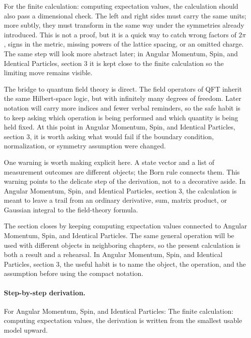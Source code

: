 For the finite calculation: computing expectation values, the calculation should also pass a dimensional check.  The left and right sides must carry the same units; more subtly, they must transform in the same way under the symmetries already introduced.  This is not a proof, but it is a quick way to catch wrong factors of \(2\pi\), signs in the metric, missing powers of the lattice spacing, or an omitted charge.  The same step will look more abstract later; in Angular Momentum, Spin, and Identical Particles, section 3 it is kept close to the finite calculation so the limiting move remains visible.

The bridge to quantum field theory is direct.  The field operators of QFT inherit the same Hilbert-space logic, but with infinitely many degrees of freedom.  Later notation will carry more indices and fewer verbal reminders, so the safe habit is to keep asking which operation is being performed and which quantity is being held fixed.  At this point in Angular Momentum, Spin, and Identical Particles, section 3, it is worth asking what would fail if the boundary condition, normalization, or symmetry assumption were changed.

One warning is worth making explicit here.  A state vector and a list of measurement outcomes are different objects; the Born rule connects them.  This warning points to the delicate step of the derivation, not to a decorative aside.  In Angular Momentum, Spin, and Identical Particles, section 3, the calculation is meant to leave a trail from an ordinary derivative, sum, matrix product, or Gaussian integral to the field-theory formula.

The section closes by keeping computing expectation values connected to Angular Momentum, Spin, and Identical Particles.  The same general operation will be used with different objects in neighboring chapters, so the present calculation is both a result and a rehearsal.  In Angular Momentum, Spin, and Identical Particles, section 3, the useful habit is to name the object, the operation, and the assumption before using the compact notation.



\paragraph{Step-by-step derivation.}

For Angular Momentum, Spin, and Identical Particles: The finite calculation: computing expectation values, the derivation is written from the smallest usable model upward.

